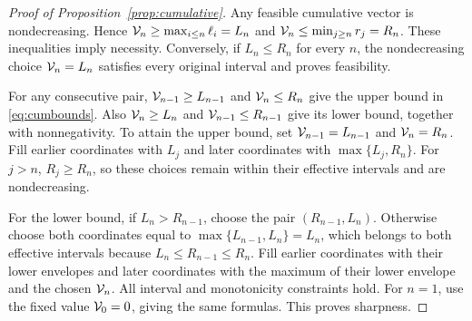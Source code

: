 \begin{proof}[Proof of Proposition~\ref{prop:cumulative}]
Any feasible cumulative vector is nondecreasing. Hence $\mathcal V_n\geq\max_{i\leq n}\ell_i=L_n$ and $\mathcal V_n\leq\min_{j\geq n}r_j=R_n$. These inequalities imply necessity. Conversely, if $L_n\leq R_n$ for every $n$, the nondecreasing choice $\mathcal V_n=L_n$ satisfies every original interval and proves feasibility.

For any consecutive pair, $\mathcal V_{n-1}\geq L_{n-1}$ and $\mathcal V_n\leq R_n$ give the upper bound in \eqref{eq:cumbounds}. Also $\mathcal V_n\geq L_n$ and $\mathcal V_{n-1}\leq R_{n-1}$ give its lower bound, together with nonnegativity. To attain the upper bound, set $\mathcal V_{n-1}=L_{n-1}$ and $\mathcal V_n=R_n$. Fill earlier coordinates with $L_j$ and later coordinates with $\max\{L_j,R_n\}$. For $j>n$, $R_j\geq R_n$, so these choices remain within their effective intervals and are nondecreasing.

For the lower bound, if $L_n>R_{n-1}$, choose the pair $(R_{n-1},L_n)$. Otherwise choose both coordinates equal to $\max\{L_{n-1},L_n\}=L_n$, which belongs to both effective intervals because $L_n\leq R_{n-1}\leq R_n$. Fill earlier coordinates with their lower envelopes and later coordinates with the maximum of their lower envelope and the chosen $\mathcal V_n$. All interval and monotonicity constraints hold. For $n=1$, use the fixed value $\mathcal V_0=0$, giving the same formulas. This proves sharpness.
\end{proof}
